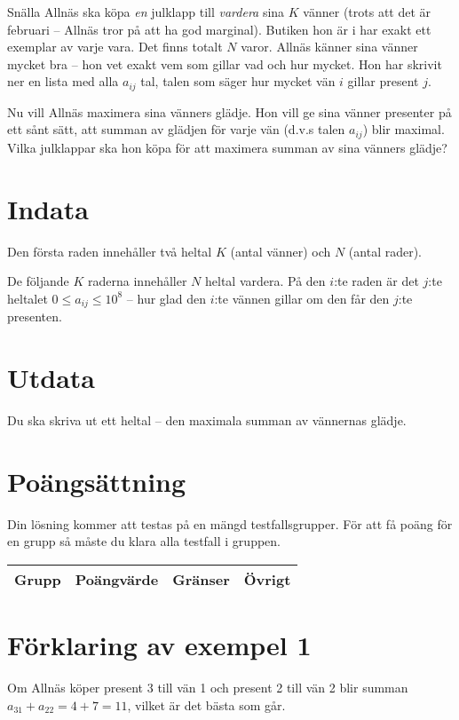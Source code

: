 Snälla Allnäs ska köpa \emph{en} julklapp till \emph{vardera} sina $K$ vänner (trots att det är februari -- Allnäs tror på att ha god marginal).
Butiken hon är i har exakt ett exemplar av varje vara.
Det finns totalt $N$ varor.
Allnäs känner sina vänner mycket bra -- hon vet exakt vem som gillar vad och hur mycket.
Hon har skrivit ner en lista med alla $a_{ij}$ tal, talen som säger hur mycket vän $i$ gillar present $j$.

Nu vill Allnäs maximera sina vänners glädje.
Hon vill ge sina vänner presenter på ett sånt sätt, att summan av glädjen för varje vän (d.v.s talen $a_{ij}$) blir maximal.
Vilka julklappar ska hon köpa för att maximera summan av sina vänners glädje?

\section*{Indata}
Den första raden innehåller två heltal $K$ (antal vänner) och $N$ (antal rader).

De följande $K$ raderna innehåller $N$ heltal vardera.
På den $i$:te raden är det $j$:te heltalet $0 \le a_{ij} \le 10^8$ -- hur glad den $i$:te vännen gillar om den får den $j$:te presenten.

\section*{Utdata}
Du ska skriva ut ett heltal -- den maximala summan av vännernas glädje.

\section*{Poängsättning}
Din lösning kommer att testas på en mängd testfallsgrupper. För att få poäng för en grupp
så måste du klara alla testfall i gruppen.

\begin{tabular}{| l | l | l | l |}
\hline
Grupp & Poängvärde & Gränser & Övrigt \\ \hline
\end{tabular}

\section*{Förklaring av exempel 1}
Om Allnäs köper present 3 till vän 1 och present 2 till vän 2 blir summan $a_{31} + a_{22} = 4 + 7 = 11$, vilket är det bästa som går.
